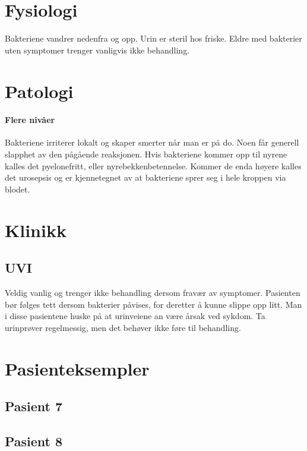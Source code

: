 		\section{Fysiologi}
			Bakteriene vandrer nedenfra og opp. Urin er steril hos friske. Eldre med bakterier uten symptomer trenger vanligvis ikke behandling. 
		\section{Patologi}
			\paragraph{Flere nivåer\\}
				Bakteriene irriterer lokalt og skaper smerter når man er på do. Noen får generell slapphet av den pågående reaksjonen. Hvis bakteriene kommer opp til nyrene kalles det pyelonefritt, eller nyrebekkenbetennelse. Kommer de enda høyere kalles det urosepsis og er kjennetegnet av at bakteriene sprer seg i hele kroppen via blodet. 
		\section{Klinikk}
			\subsection{UVI}
				Veldig vanlig og trenger ikke behandling dersom fravær av symptomer. Pasienten bør følges tett dersom bakterier påvises, for deretter å kunne slippe opp litt. Man i disse pasientene huske på at urinveiene an være årsak ved sykdom. Ta urinprøver regelmessig, men det behøver ikke føre til behandling.
		\section{Pasienteksempler}
			\subsection{Pasient 7}
			\subsection{Pasient 8}